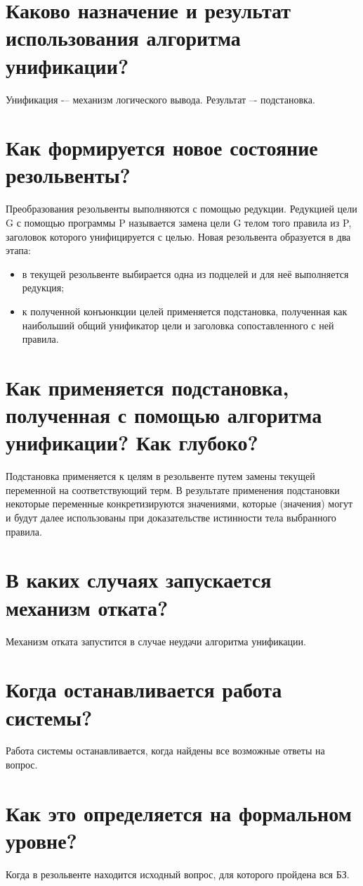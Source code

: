 \section{Каково назначение и результат использования алгоритма унификации?}

Унификация -– механизм логического вывода. Результат –- подстановка.

\section{Как формируется новое состояние резольвенты?}

Преобразования резольвенты выполняются с помощью редукции. Редукцией цели G с помощью программы P называется замена цели G телом того правила из P, заголовок которого унифицируется с целью. Новая резольвента образуется в два этапа:
\begin{itemize}
    \item в текущей резольвенте выбирается одна из подцелей и для неё выполняется редукция;
    \item к полученной конъюнкции целей применяется подстановка, полученная как наибольший общий унификатор цели и заголовка сопоставленного с ней правила.
\end{itemize}

\section{Как применяется подстановка, полученная с помощью алгоритма унификации? Как глубоко?}

Подстановка применяется к целям в резольвенте путем замены текущей переменной на соответствующий терм. В результате применения подстановки некоторые переменные конкретизируются значениями, которые (значения) могут и будут далее использованы при доказательстве истинности тела выбранного правила.

\section{В каких случаях запускается механизм отката?}

Механизм отката запустится в случае неудачи алгоритма унификации.

\section{Когда останавливается работа системы?}

Работа системы останавливается, когда найдены все возможные ответы на вопрос.

\section{Как это определяется на формальном уровне?}

Когда в резольвенте находится исходный вопрос, для которого пройдена вся БЗ.